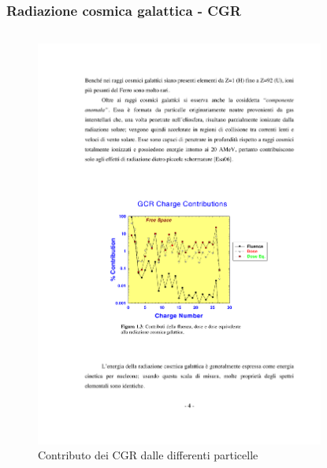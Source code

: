 \documentclass[9pt]{beamer}
\begin{document}
\begin{frame} [fragile]
\small
	\frametitle{Radiazione cosmica galattica - CGR}
\begin{columns}
  \begin{column}{0.50\textwidth}
\begin{figure}
	  \centering
			\includegraphics[scale=.55]{figures/fig2_2.pdf}
			\caption{Contributo dei CGR dalle differenti particelle}
		\end{figure}
	 \end{column}
    \begin{column}{0.50\textwidth}
 \newline
\begin{figure}
	  \centering

\end{figure}
\end{column}
\end{columns}
\end{frame}
\end{document}
